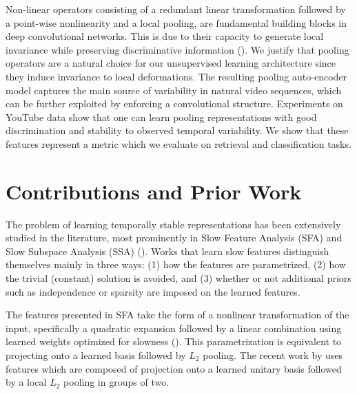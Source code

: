 \documentclass{article} %
\begin{document}
Non-linear operators consisting of a redundant linear transformation followed by a point-wise nonlinearity and a local pooling, are fundamental building blocks in deep convolutional networks. This is due to their capacity to generate local invariance while preserving discriminative information (\cite{LeCun1998, JoanScat}). We justify that pooling operators are a natural choice for our unsupervised learning architecture since they induce invariance to local deformations. The resulting pooling auto-encoder model captures the main source of variability in natural video sequences, which can be further exploited by enforcing a convolutional structure. Experiments on YouTube data show that one can learn pooling representations with good discrimination and stability to observed temporal variability. We show that these features represent a metric which we evaluate on retrieval and classification tasks. 

\section{Contributions and Prior Work} 
The problem of learning temporally stable representations has been extensively studied in the literature, most prominently in Slow Feature Analysis (SFA) and Slow Subspace Analysis (SSA) (\cite{SFA,SSA,hyvarinen2003bubbles}). Works that learn slow features distinguish themselves mainly in three ways: (1) how the features are parametrized, (2) how the trivial (constant) solution is avoided, and (3) whether or not additional priors such as independence or sparsity are imposed on the learned features. 

The features presented in SFA take the form of a nonlinear transformation of the input, specifically a quadratic expansion followed by a linear combination using learned weights optimized for slowness (\cite{SFA}). 
This parametrization is equivalent to projecting onto a learned basis followed by $L_2$ pooling. The recent work by \cite{complexCells} uses features which are composed of projection onto a learned unitary basis followed by a local $L_2$ pooling in groups of two. 
\end{document}
